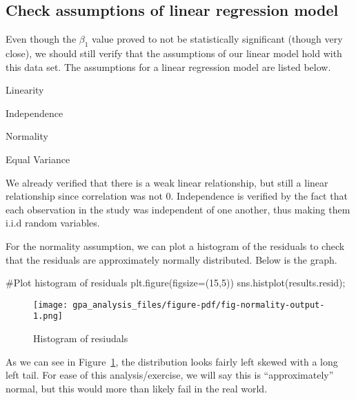 \documentclass[
  letterpaper,
  DIV=11,
  numbers=noendperiod]{scrreprt}
\newenvironment{Shaded}{\begin{snugshade}}{\end{snugshade}}
\newcommand{\CommentTok}[1]{\textcolor[rgb]{0.37,0.37,0.37}{#1}}
\newcommand{\DecValTok}[1]{\textcolor[rgb]{0.68,0.00,0.00}{#1}}
\newcommand{\NormalTok}[1]{\textcolor[rgb]{0.00,0.23,0.31}{#1}}
\newcommand{\OperatorTok}[1]{\textcolor[rgb]{0.37,0.37,0.37}{#1}}
\begin{document}
\hypertarget{check-assumptions-of-linear-regression-model}{%
\subsection{Check assumptions of linear regression
model}\label{check-assumptions-of-linear-regression-model}}

Even though the \(\beta_1\) value proved to not be statistically
significant (though very close), we should still verify that the
assumptions of our linear model hold with this data set. The assumptions
for a linear regression model are listed below.

Linearity

Independence

Normality

Equal Variance

We already verified that there is a weak linear relationship, but still
a linear relationship since correlation was not 0. Independence is
verified by the fact that each observation in the study was independent
of one another, thus making them i.i.d random variables.

For the normality assumption, we can plot a histogram of the residuals
to check that the residuals are approximately normally distributed.
Below is the graph.

\begin{Shaded}
\begin{Highlighting}[]
\CommentTok{\#Plot histogram of residuals}
\NormalTok{plt.figure(figsize}\OperatorTok{=}\NormalTok{(}\DecValTok{15}\NormalTok{,}\DecValTok{5}\NormalTok{))}
\NormalTok{sns.histplot(results.resid)}\OperatorTok{;}
\end{Highlighting}
\end{Shaded}

\begin{figure}[H]

{\centering \texttt{[image: gpa\_analysis\_files/figure-pdf/fig-normality-output-1.png]}

}

\caption{\label{fig-normality}Histogram of resiudals}

\end{figure}

As we can see in Figure~\ref{fig-normality}, the distribution looks
fairly left skewed with a long left tail. For ease of this
analysis/exercise, we will say this is ``approximately'' normal, but
this would more than likely fail in the real world.
\end{document}
